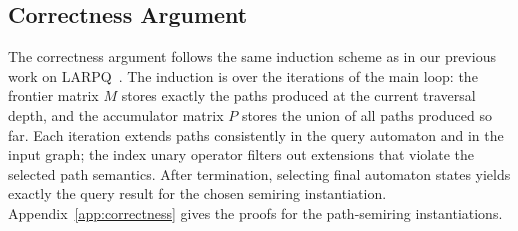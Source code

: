\subsection{Correctness Argument}

The correctness argument follows the same induction scheme as in our previous work on LARPQ~\cite[Appendix~A]{belyanin2150single}.
The induction is over the iterations of the main loop: the frontier matrix $M$ stores exactly the paths produced at the current traversal depth, and the accumulator matrix $P$ stores the union of all paths produced so far.
Each iteration extends paths consistently in the query automaton and in the input graph; the index unary operator filters out extensions that violate the selected path semantics.
After termination, selecting final automaton states yields exactly the query result for the chosen semiring instantiation.
Appendix~\ref{app:correctness} gives the proofs for the path-semiring instantiations.
